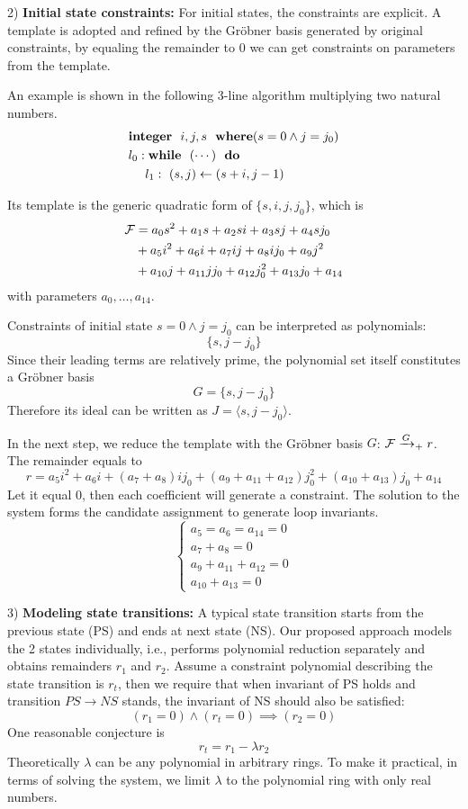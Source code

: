 2) {\bf Initial state constraints:} For initial states, the constraints are explicit. 
A template is adopted and refined by the Gr\"obner basis 
generated by original constraints, by equaling the remainder to 0 we can get constraints on
parameters from the template.

An example is shown in the following 3-line algorithm multiplying two natural numbers. 
\begin{align}
\label{eqn:loopinv}
& {\bf integer}~~i,j,s~~{\bf where}(s=0 \land j=j_0) \nonumber\\
& l_0: {\bf while}~~(\cdots)~~{\bf do} \nonumber\\
& ~~~~ l_1:~(s,j)\gets(s+i,j-1) 
\end{align}

Its template is the generic quadratic form of $\{s,i,j,j_0\}$, which is
\begin{align}
{\mathcal{F}} &= a_0s^2+a_1s+a_2si+a_3sj+a_4sj_0\nonumber\\
&+a_5i^2+a_6i+a_7ij+a_8ij_0+a_9j^2\nonumber\\
&+a_{10}j+a_{11}jj_0+a_{12}j_0^2+a_{13}j_0+a_{14}\nonumber
\end{align}
with parameters $a_0,\dots,a_{14}$.

Constraints of initial state $s=0\land j=j_0$ can be interpreted as polynomials:
$$\{s, j-j_0\}$$
Since their leading terms are relatively prime, the polynomial set itself constitutes a Gr\"obner basis 
$$G=\{s, j-j_0\}$$ 
Therefore its ideal can be written as
$J=\langle s,j-j_0\rangle$.

In the next step, we reduce the template with the Gr\"obner basis $G$: ${\mathcal{F}} \xrightarrow{G}_+ r$. The remainder equals to
$$r = a_5i^2+a_6i+(a_7+a_8)ij_0+(a_9+a_{11}+a_{12})j_0^2+(a_{10}+a_{13})j_0+a_{14}$$
Let it equal 0, then each coefficient will generate a constraint. The solution to the system forms the candidate
assignment to generate loop invariants.
\begin{equation}
\label{eqn:parasys}
\left\{
\begin{array}{l}
a_5=a_6=a_{14}=0\\
a_7+a_8=0\\
a_9+a_{11}+a_{12}=0\\
a_{10}+a_{13}=0
\end{array}\right.
\end{equation}

3) {\bf Modeling state transitions:}
A typical state transition starts from the previous state (PS) and ends at next state (NS). 
Our proposed approach models the 2 states individually,
i.e., performs polynomial reduction separately and obtains remainders $r_1$ and $r_2$. 
Assume a constraint polynomial describing
the state transition is $r_t$, then we require that when invariant of PS holds and transition $PS \to NS$ stands,
the invariant of NS should also be satisfied:
$$(r_1 = 0)\land (r_t = 0) \implies (r_2 = 0)$$
One reasonable conjecture is
$$r_t = r_1 - \lambda r_2$$
Theoretically $\lambda$ can be any polynomial in arbitrary rings. To make it practical, in terms of solving the system, 
we limit $\lambda$ to the polynomial ring with only real numbers.

